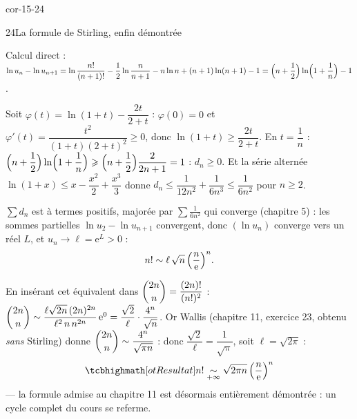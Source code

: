 \begin{blocLivre}{cor-15-24}
\begin{corrige}{24}{La formule de Stirling, enfin démontrée}
\begin{questions}
  \item Calcul direct :
    $\ln u_n-\ln u_{n+1}
    =\ln\dfrac{n!}{(n+1)!}-\dfrac12\ln\dfrac{n}{n+1}-n\ln n+(n+1)\ln(n+1)-1
    =\Bigl(n+\dfrac12\Bigr)\ln\Bigl(1+\dfrac1n\Bigr)-1$.
  \item Soit $\varphi(t)=\ln(1+t)-\dfrac{2t}{2+t}$ :
    $\varphi(0)=0$ et
    $\varphi'(t)=\dfrac{t^{2}}{(1+t)(2+t)^{2}}\geqslant0$, donc
    $\ln(1+t)\geqslant\dfrac{2t}{2+t}$. En $t=\dfrac1n$ :
    $\Bigl(n+\dfrac12\Bigr)\ln\Bigl(1+\dfrac1n\Bigr)
    \geqslant\Bigl(n+\dfrac12\Bigr)\dfrac{2}{2n+1}=1$ : $d_n\geqslant0$.
    Et la série alternée
    $\ln(1+x)\leqslant x-\dfrac{x^{2}}{2}+\dfrac{x^{3}}{3}$ donne
    $d_n\leqslant\dfrac{1}{12n^{2}}+\dfrac{1}{6n^{3}}
    \leqslant\dfrac{1}{6n^{2}}$ pour $n\geqslant2$.
  \item $\sum d_n$ est à termes positifs, majorée par
    $\sum\frac{1}{6n^{2}}$ qui converge (chapitre 5) : les sommes
    partielles $\ln u_2-\ln u_{n+1}$ convergent, donc $(\ln u_n)$
    converge vers un réel $L$, et $u_n\to\ell=\mathrm{e}^{L}>0$ :
    \[
    n!\sim\ell\,\sqrt n\,\Bigl(\frac{n}{\mathrm{e}}\Bigr)^{n}.
    \]
  \item En insérant cet équivalent dans
    $\dbinom{2n}{n}=\dfrac{(2n)!}{(n!)^{2}}$ :
    $\dbinom{2n}{n}\sim\dfrac{\ell\sqrt{2n}\,(2n)^{2n}}
    {\ell^{2}\,n\,n^{2n}}\,\mathrm{e}^{0}
    =\dfrac{\sqrt2}{\ell}\cdot\dfrac{4^{n}}{\sqrt n}$. Or Wallis
    (chapitre 11, exercice 23, obtenu \emph{sans} Stirling) donne
    $\dbinom{2n}{n}\sim\dfrac{4^{n}}{\sqrt{\pi n}}$ : donc
    $\dfrac{\sqrt2}{\ell}=\dfrac{1}{\sqrt\pi}$, soit
    $\ell=\sqrt{2\pi}$ :
    \[
    \res{n!\underset{+\infty}{\sim}\sqrt{2\pi n}\,
    \Bigl(\frac{n}{\mathrm{e}}\Bigr)^{n}}
    \]
    — la formule admise au chapitre 11 est désormais entièrement
    démontrée : un cycle complet du cours se referme.
\end{questions}
\end{corrige}
\end{blocLivre}


